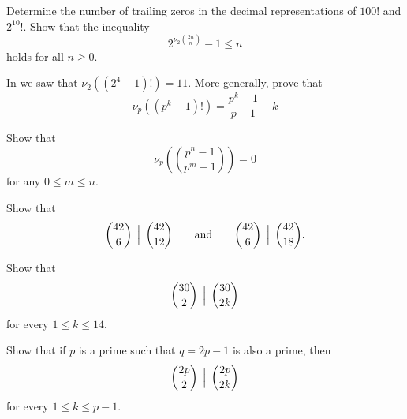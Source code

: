 \begin{routine}
  \exercise Determine the number of trailing zeros in the decimal representations of $100!$ and $2^{10}!$.
  \exercise Show that the inequality
  \begin{equation*}
    2^{\nu_2\binom{2n}{n}}-1\leq n
  \end{equation*}
  holds for all $n\geq 0$.
  \exercise
  \begin{subexenum}
  \item In  we saw that $\nu_2((2^4-1)!)=11$. More generally, prove that
  \begin{equation*}
    \nu_p((p^k-1)!)=\frac{p^k-1}{p-1}-k
  \end{equation*}
  \item Show that
  \begin{equation*}
    \nu_p\left(\binom{p^n-1}{p^m-1}\right)=0
  \end{equation*}
  for any $0\leq m\leq n$.
  \end{subexenum}
  \exercise Show that
  \begin{equation*}
    \binom{42}{6}\,\Bigm|\,\binom{42}{12}\qquad\text{and}\qquad \binom{42}{6}\,\Bigm|\,\binom{42}{18}.
  \end{equation*}
  \exercise
  \begin{subexenum}
  \item Show that
    \begin{equation*}
      \binom{30}{2}\,\Bigm|\,\binom{30}{2k}
    \end{equation*}
    for every $1\leq k\leq 14$.
  \item Show that if $p$ is a prime such that $q=2p-1$ is also a prime, then
    \begin{equation*}
      \binom{2p}{2}\,\Bigm|\,\binom{2p}{2k}
    \end{equation*}
    for every $1\leq k\leq p-1$.
  \end{subexenum}

\end{routine}
